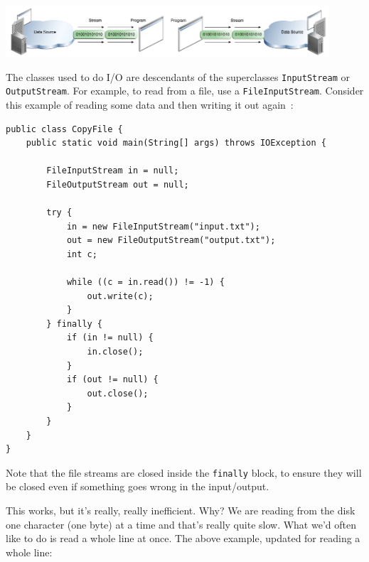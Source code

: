 \begin{center}
\includegraphics[width=0.45\textwidth]{images/inputstream.png}\includegraphics[width=0.45\textwidth]{images/outputstream.png}
\cite{oracle:streams}
\end{center}

The classes used to do I/O are descendants of the superclasses \texttt{InputStream} or \texttt{OutputStream}. For example, to read from a file, use a \texttt{FileInputStream}. Consider this example of reading some data and then writing it out again~\cite{oracle:streams}:

\begin{verbatim}
public class CopyFile {
    public static void main(String[] args) throws IOException {

        FileInputStream in = null;
        FileOutputStream out = null;

        try {
            in = new FileInputStream("input.txt");
            out = new FileOutputStream("output.txt");
            int c;

            while ((c = in.read()) != -1) {
                out.write(c);
            }
        } finally {
            if (in != null) {
                in.close();
            }
            if (out != null) {
                out.close();
            }
        }
    }
}
\end{verbatim}

Note that the file streams are closed inside the \texttt{finally} block, to ensure they will be closed even if something goes wrong in the input/output. 

This works, but it's really, really inefficient. Why? We are reading from the disk one character (one byte) at a time and that's really quite slow. What we'd often like to do is read a whole line at once. The above example, updated for reading a whole line:

